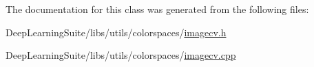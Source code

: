 The documentation for this class was generated from the following files\+:\begin{DoxyCompactItemize}
\item 
Deep\+Learning\+Suite/libs/utils/colorspaces/\hyperlink{imagecv_8h}{imagecv.\+h}\item 
Deep\+Learning\+Suite/libs/utils/colorspaces/\hyperlink{imagecv_8cpp}{imagecv.\+cpp}\end{DoxyCompactItemize}
